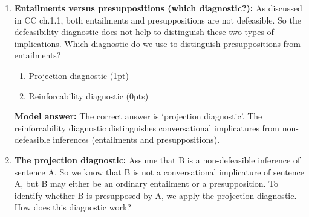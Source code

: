 \documentclass[a4,11pt]{article}
\begin{document}
\begin{enumerate}[leftmargin = 12pt]
 {\bf Model answer:} The correct answer is {\em The theremin duo that Mozart wrote is very famous, but it is not the case that Mozart wrote a theremin duo}. In this example, sentence A ({\em The theremin duo that Mozart wrote is very famous}) is combined with the negation of the inference we want to diagnose (the inference is that Mozart wrote a theremin duo). In the answer {\em The theremin duo that Mozart wrote is very famous, but it is not the case that the theremin duo that Mozart wrote is very famous},  sentence A is combined with its own negation! This does not serve to diagnose the type of implication contributed by the definite noun phrase. In the answer {\em The theremin duo that Mozart wrote is very famous, but Mozart wrote a theremin duo}, sentence A is combined with the inference contributed by the definite noun phrase: this also does not serve to diagnose the type of inference: we already know that the inference arises form A, so we don't learn anything new by combining the two in this way.
 
 \item {\bf Entailments versus presuppositions (which diagnostic?):} As discussed in CC ch.1.1, both entailments and presuppositions are not defeasible. So the defeasibility diagnostic does not help to distinguish these two types of implications. Which diagnostic do we use to distinguish presuppositions from entailments?

   \begin{enumerate}[noitemsep]
        \item Projection diagnostic (1pt)
        \item Reinforcability diagnostic (0pts)
    \end{enumerate}
    
  {\bf Model answer:}  The correct answer is  `projection diagnostic'. The reinforcability diagnostic distinguishes conversational implicatures from non-defeasible inferences (entailments and presuppositions).
    
 \item {\bf The projection diagnostic:}  Assume that B is a non-defeasible inference of sentence A. So we know that B is not a conversational implicature of sentence A, but B may either be an ordinary entailment or a presupposition. To identify whether B is presupposed by A, we apply the projection diagnostic. How does this diagnostic work?
 
    \begin{enumerate}[noitemsep]


\end{enumerate}
\end{enumerate}
\end{document}

